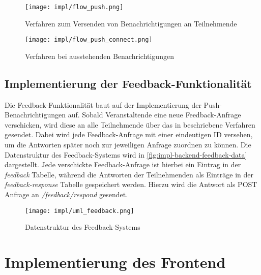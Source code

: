\begin{figure}[htpb]
    \centering
    \texttt{[image: impl/flow\_push.png]}
    \caption{Verfahren zum Versenden von Benachrichtigungen an Teilnehmende}
    \label{fig:impl-backend-push}
\end{figure}

\begin{figure}[htpb]
    \centering
    \texttt{[image: impl/flow\_push\_connect.png]}
    \caption{Verfahren bei ausstehenden Benachrichtigungen}
    \label{fig:impl-backend-push-connect}
\end{figure}

\subsection{Implementierung der Feedback-Funktionalität}

Die Feedback-Funktionalität baut auf der Implementierung der
Push-Benachrichtigungen auf. Sobald Veranstaltende eine neue Feedback-Anfrage
verschicken, wird diese an alle Teilnehmende über das in
 beschriebene Verfahren gesendet. Dabei wird
jede Feedback-Anfrage mit einer eindeutigen ID versehen, um die Antworten später
noch zur jeweiligen Anfrage zuordnen zu können. Die Datenstruktur des
Feedback-Systems wird in \autoref{fig:impl-backend-feedback-data} dargestellt.
Jede verschickte Feedback-Anfrage ist hierbei ein Eintrag in der
\textit{feedback} Tabelle, während die Antworten der Teilnehmenden als Einträge
in der \textit{feedback-response} Tabelle gespeichert werden. Hierzu wird die
Antwort als POST Anfrage an \textit{/feedback/respond} gesendet.

\begin{figure}[htpb]
    \centering
    \texttt{[image: impl/uml\_feedback.png]}
    \caption{Datenstruktur des Feedback-Systems}
    \label{fig:impl-backend-feedback-data}
\end{figure}



\section{Implementierung des Frontend}

